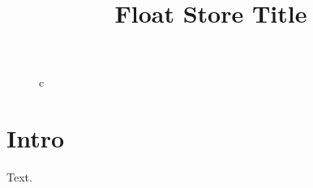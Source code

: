 \documentclass{article}
\title{Float Store Title}
\begin{document}
\begin{figure}[h]\centering{\Large \@title\par}\caption{c}\end{figure}
\section{Intro}
Text.
\end{document}
